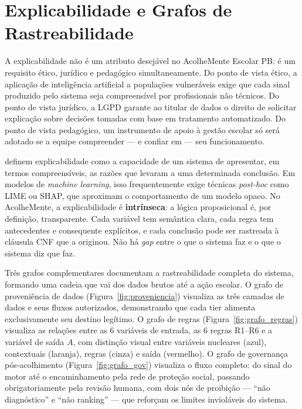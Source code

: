 \documentclass[
    12pt,
    openright,
    oneside,
    a4paper,
    english,
    brazil
]{abntex2}
\begin{document}
\chapter{Explicabilidade e Grafos de Rastreabilidade}

A explicabilidade n\~ao \'e um atributo desej\'avel no AcolheMente Escolar PB: \'e um requisito \'etico, jur\'idico e pedag\'ogico simultaneamente. Do ponto de vista \'etico, a aplica\c{c}\~ao de intelig\^encia artificial a popula\c{c}\~oes vulner\'aveis exige que cada sinal produzido pelo sistema seja compreens\'ivel por profissionais n\~ao t\'ecnicos. Do ponto de vista jur\'idico, a LGPD \cite{brasil_lgpd_2018} garante ao titular de dados o direito de solicitar explica\c{c}\~ao sobre decis\~oes tomadas com base em tratamento automatizado. Do ponto de vista pedag\'ogico, um instrumento de apoio \`a gest\~ao escolar s\'o ser\'a adotado se a equipe compreender --- e confiar em --- seu funcionamento.

 definem explicabilidade como a capacidade de um sistema de apresentar, em termos compreens\'iveis, as raz\~oes que levaram a uma determinada conclus\~ao. Em modelos de \textit{machine learning}, isso frequentemente exige t\'ecnicas \textit{post-hoc} como LIME ou SHAP, que aproximam o comportamento de um modelo opaco. No AcolheMente, a explicabilidade \'e \textbf{intr\'inseca}: a l\'ogica proposicional \'e, por defini\c{c}\~ao, transparente. Cada vari\'avel tem sem\^antica clara, cada regra tem antecedentes e consequente expl\'icitos, e cada conclus\~ao pode ser rastreada \`a cl\'ausula CNF que a originou. N\~ao h\'a \textit{gap} entre o que o sistema faz e o que o sistema diz que faz.

Tr\^es grafos complementares documentam a rastreabilidade completa do sistema, formando uma cadeia que vai dos dados brutos at\'e a a\c{c}\~ao escolar. O grafo de proveni\^encia de dados (Figura~\ref{fig:proveniencia}) visualiza as tr\^es camadas de dados e seus fluxos autorizados, demonstrando que cada tier alimenta exclusivamente seu destino leg\'itimo. O grafo de regras (Figura~\ref{fig:grafo_regras}) visualiza as rela\c{c}\~oes entre as 6 vari\'aveis de entrada, as 6 regras R1--R6 e a vari\'avel de sa\'ida $A$, com distin\c{c}\~ao visual entre vari\'aveis nucleares (azul), contextuais (laranja), regras (cinza) e sa\'ida (vermelho). O grafo de governan\c{c}a p\'os-acolhimento (Figura~\ref{fig:grafo_gov}) visualiza o fluxo completo: do sinal do motor at\'e o encaminhamento pela rede de prote\c{c}\~ao social, passando obrigatoriamente pela revis\~ao humana, com dois n\'os de proibi\c{c}\~ao --- ``n\~ao diagn\'ostico'' e ``n\~ao ranking'' --- que refor\c{c}am os limites inviol\'aveis do sistema.
\end{document}
